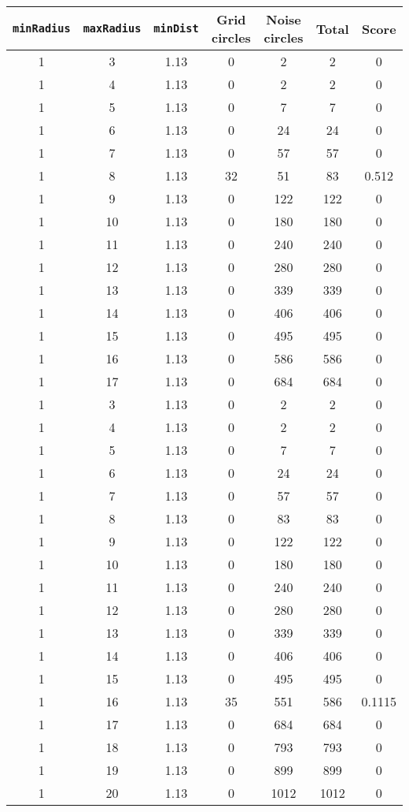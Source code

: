 \documentclass[letterpaper, 12pt]{article}
\begin{document}
\begin{longtable}{|c|c|c|c|c|c|c|}
\hline
\textbf{\texttt{minRadius}} & \textbf{\texttt{maxRadius}} & \textbf{\texttt{minDist}} & \textbf{Grid circles} & \textbf{Noise circles} & \textbf{Total} & \textbf{Score} \\
\hline
1 & 3 & 1.13 & 0 & 2 & 2 & 0 \\
\hline
1 & 4 & 1.13 & 0 & 2 & 2 & 0 \\
\hline
1 & 5 & 1.13 & 0 & 7 & 7 & 0 \\
\hline
1 & 6 & 1.13 & 0 & 24 & 24 & 0 \\
\hline
1 & 7 & 1.13 & 0 & 57 & 57 & 0 \\
\hline
1 & 8 & 1.13 & 32 & 51 & 83 & 0.512 \\
\hline
1 & 9 & 1.13 & 0 & 122 & 122 & 0 \\
\hline
1 & 10 & 1.13 & 0 & 180 & 180 & 0 \\
\hline
1 & 11 & 1.13 & 0 & 240 & 240 & 0 \\
\hline
1 & 12 & 1.13 & 0 & 280 & 280 & 0 \\
\hline
1 & 13 & 1.13 & 0 & 339 & 339 & 0 \\
\hline
1 & 14 & 1.13 & 0 & 406 & 406 & 0 \\
\hline
1 & 15 & 1.13 & 0 & 495 & 495 & 0 \\
\hline
1 & 16 & 1.13 & 0 & 586 & 586 & 0 \\
\hline
1 & 17 & 1.13 & 0 & 684 & 684 & 0 \\
\hline
1 & 3 & 1.13 & 0 & 2 & 2 & 0 \\
\hline
1 & 4 & 1.13 & 0 & 2 & 2 & 0 \\
\hline
1 & 5 & 1.13 & 0 & 7 & 7 & 0 \\
\hline
1 & 6 & 1.13 & 0 & 24 & 24 & 0 \\
\hline
1 & 7 & 1.13 & 0 & 57 & 57 & 0 \\
\hline
1 & 8 & 1.13 & 0 & 83 & 83 & 0 \\
\hline
1 & 9 & 1.13 & 0 & 122 & 122 & 0 \\
\hline
1 & 10 & 1.13 & 0 & 180 & 180 & 0 \\
\hline
1 & 11 & 1.13 & 0 & 240 & 240 & 0 \\
\hline
1 & 12 & 1.13 & 0 & 280 & 280 & 0 \\
\hline
1 & 13 & 1.13 & 0 & 339 & 339 & 0 \\
\hline
1 & 14 & 1.13 & 0 & 406 & 406 & 0 \\
\hline
1 & 15 & 1.13 & 0 & 495 & 495 & 0 \\
\hline
1 & 16 & 1.13 & 35 & 551 & 586 & 0.1115 \\
\hline
1 & 17 & 1.13 & 0 & 684 & 684 & 0 \\
\hline
1 & 18 & 1.13 & 0 & 793 & 793 & 0 \\
\hline
1 & 19 & 1.13 & 0 & 899 & 899 & 0 \\
\hline
1 & 20 & 1.13 & 0 & 1012 & 1012 & 0 \\
\hline
\end{longtable}
\end{document}
